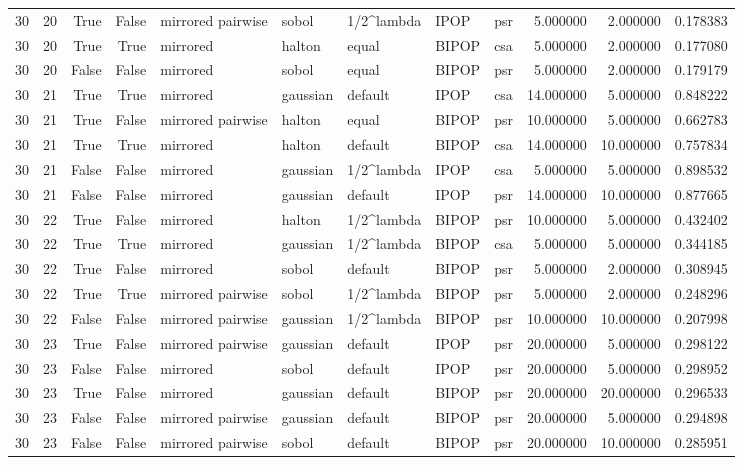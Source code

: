 \begin{tabular}{rrrrlllllrrr}
30 & 20 & True & False & mirrored pairwise & sobol & 1/2^lambda & IPOP & psr & 5.000000 & 2.000000 & 0.178383 \\
30 & 20 & True & True & mirrored & halton & equal & BIPOP & csa & 5.000000 & 2.000000 & 0.177080 \\
30 & 20 & False & False & mirrored & sobol & equal & BIPOP & psr & 5.000000 & 2.000000 & 0.179179 \\
30 & 21 & True & True & mirrored & gaussian & default & IPOP & csa & 14.000000 & 5.000000 & 0.848222 \\
30 & 21 & True & False & mirrored pairwise & halton & equal & BIPOP & psr & 10.000000 & 5.000000 & 0.662783 \\
30 & 21 & True & True & mirrored & halton & default & BIPOP & csa & 14.000000 & 10.000000 & 0.757834 \\
30 & 21 & False & False & mirrored & gaussian & 1/2^lambda & IPOP & csa & 5.000000 & 5.000000 & 0.898532 \\
30 & 21 & False & False & mirrored & gaussian & default & IPOP & psr & 14.000000 & 10.000000 & 0.877665 \\
30 & 22 & True & False & mirrored & halton & 1/2^lambda & BIPOP & psr & 10.000000 & 5.000000 & 0.432402 \\
30 & 22 & True & True & mirrored & gaussian & 1/2^lambda & BIPOP & csa & 5.000000 & 5.000000 & 0.344185 \\
30 & 22 & True & False & mirrored & sobol & default & BIPOP & psr & 5.000000 & 2.000000 & 0.308945 \\
30 & 22 & True & True & mirrored pairwise & sobol & 1/2^lambda & BIPOP & psr & 5.000000 & 2.000000 & 0.248296 \\
30 & 22 & False & False & mirrored pairwise & gaussian & 1/2^lambda & BIPOP & psr & 10.000000 & 10.000000 & 0.207998 \\
30 & 23 & True & False & mirrored pairwise & gaussian & default & IPOP & psr & 20.000000 & 5.000000 & 0.298122 \\
30 & 23 & False & False & mirrored & sobol & default & IPOP & psr & 20.000000 & 5.000000 & 0.298952 \\
30 & 23 & True & False & mirrored & gaussian & default & BIPOP & psr & 20.000000 & 20.000000 & 0.296533 \\
30 & 23 & False & False & mirrored pairwise & gaussian & default & BIPOP & psr & 20.000000 & 5.000000 & 0.294898 \\
30 & 23 & False & False & mirrored pairwise & sobol & default & BIPOP & psr & 20.000000 & 10.000000 & 0.285951 \\

\end{tabular}
